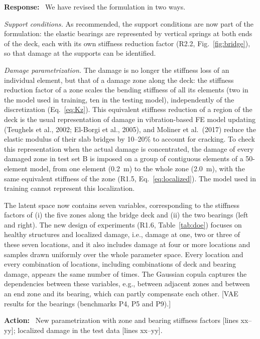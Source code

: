 \documentclass[11pt]{article}
\newenvironment{response}{\par\smallskip\noindent\color{resp}\textbf{Response:}\ }{\par}
\newenvironment{action}{\par\smallskip\noindent\color{resp}\textbf{Action:}\ }{\par}
\newcommand{\tbd}[1]{\textcolor{note}{\textsf{[#1]}}}
\newcommand{\lines}[1]{\tbd{lines #1}}
\begin{document}
\begin{response}
We have revised the formulation in two ways.

\textit{Support conditions.} As recommended, the support conditions are now part of the formulation: the elastic bearings
are represented by vertical springs at both ends of the deck, each with its own stiffness reduction factor (R2.2,
Fig.~\ref{fig:bridge}), so that damage at the supports can be identified.

\textit{Damage parametrization.} The damage is no longer the stiffness loss of an individual element, but that of a damage
zone along the deck: the stiffness reduction factor of a zone scales the bending stiffness of all its elements (two in the
model used in training, ten in the testing model), independently of the discretization (Eq.~\eqref{eq:Kz}). This
equivalent stiffness reduction of a region of the deck is the usual representation of damage in vibration-based FE model
updating (Teughels et al., 2002; El-Borgi et al., 2005), and Moliner et al.\ (2017) reduce the elastic modulus of their
slab bridges by 10--20\% to account for cracking. To check this representation when the actual damage is concentrated,
the damage of every damaged zone in test set B is imposed on a group of contiguous elements of a 50-element model, from one
element (0.2~m) to the whole zone (2.0~m), with the same equivalent stiffness of the zone (R1.5, Eq.~\eqref{eq:localized}).
The model used in training cannot represent this localization.

The latent space now contains seven variables, corresponding to the stiffness factors of (i) the five zones along the
bridge deck and (ii) the two bearings (left and right). The new design of experiments (R1.6, Table~\ref{tab:doe}) focuses
on healthy structures and localized damage, i.e., damage at one, two or three of these seven locations, and it also
includes damage at four or more locations and samples drawn uniformly over the whole parameter space. Every location and every
combination of locations, including combinations of deck and bearing damage, appears the same number of times. The
Gaussian copula captures the dependencies between these variables, e.g., between adjacent zones and between an end zone
and its bearing, which can partly compensate each other.
\tbd{VAE results for the bearings (benchmarks P4, P5 and P9).}
\end{response}

\begin{action}
New parametrization with zone and bearing stiffness factors \lines{xx--yy}; localized damage in the test data
\lines{xx--yy}.
\end{action}
\end{document}
